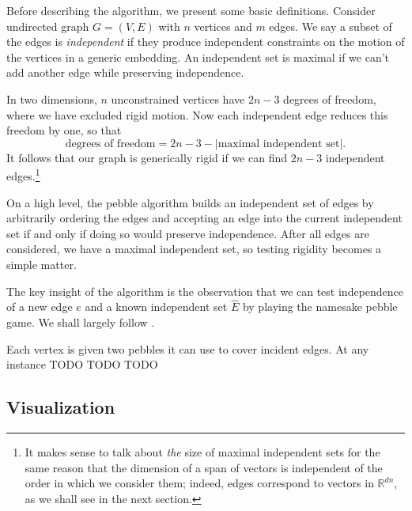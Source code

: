 \documentclass[aps,prd,final,twocolumn,letterpaper,nofootinbib]{revtex4-1}
\newcommand\RR{\mathbb{R}}
\newcommand{\abs}[1]{|#1|}
\begin{document}
Before describing the algorithm,
we present some basic definitions.
Consider undirected graph $G = (V, E)$
with $n$ vertices and $m$ edges.
We say a subset of the edges is \emph{independent}
if they produce independent constraints on the motion of the vertices
in a generic embedding.
An independent set is maximal if we can't add another edge
while preserving independence.

In two dimensions, $n$ unconstrained vertices have $2n-3$ degrees of freedom,
where we have excluded rigid motion.
Now each independent edge reduces this freedom by one,
so that
\[
    \text{degrees of freedom} = 2n - 3 - \abs{\text{maximal independent set}}.
\]
It follows that our graph is generically rigid
if we can find $2n-3$ independent edges.\footnote{It makes sense
to talk about \emph{the} size 
of maximal independent sets
for the same reason that the dimension of a span of vectors
is independent of the order in which we consider them;
indeed, edges correspond to vectors in $\RR^{dn}$,
as we shall see in the next section.}

On a high level,
the pebble algorithm builds an independent set of edges
by arbitrarily ordering the edges
and accepting an edge into the current independent set
if and only if doing so would preserve independence.
After all edges are considered,
we have a maximal independent set,
so testing rigidity becomes a simple matter.

The key insight of the algorithm
is the observation that we can test independence of a new edge $e$
and a known independent set $\hat E$
by playing the namesake pebble game.
We shall largely follow \cite{stjohnapplet}.

Each vertex is given two pebbles it can use to cover incident edges.
At any instance TODO TODO TODO


\subsection{Visualization}
\end{document}
